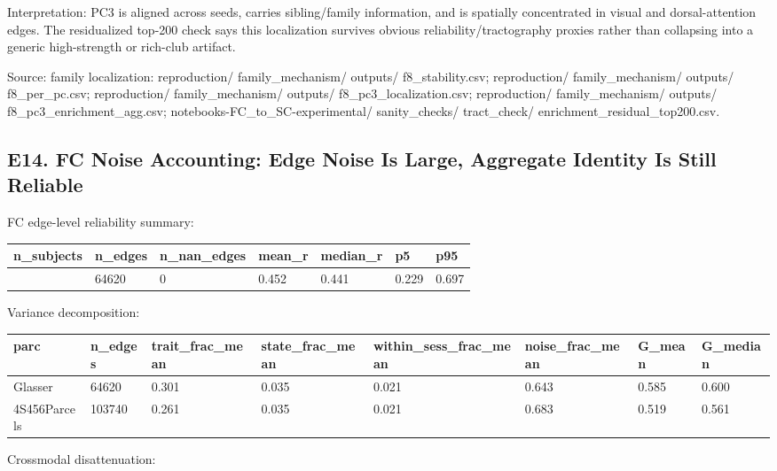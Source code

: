 Interpretation: PC3 is aligned across seeds, carries sibling/family information, and is spatially concentrated in visual and dorsal-attention edges. The residualized top-200 check says this localization survives obvious reliability/tractography proxies rather than collapsing into a generic high-strength or rich-club artifact.

Source: family localization: reproduction/ family\_mechanism/ outputs/ f8\_stability.csv; reproduction/ family\_mechanism/ outputs/ f8\_per\_pc.csv; reproduction/ family\_mechanism/ outputs/ f8\_pc3\_localization.csv; reproduction/ family\_mechanism/ outputs/ f8\_pc3\_enrichment\_agg.csv; notebooks-FC\_to\_SC-experimental/ sanity\_checks/ tract\_check/ enrichment\_residual\_top200.csv.

\subsection{E14. FC Noise Accounting: Edge Noise Is Large, Aggregate Identity Is Still Reliable}\label{e14-fc-noise-accounting-edge-noise-is-large-aggregate-identity-is-still-reliable}

FC edge-level reliability summary:

{\def\LTcaptype{none} %
\begin{longtable}[]{@{}lllllll@{}}
\toprule\noalign{}
n\_subjects & n\_edges & n\_nan\_edges & mean\_r & median\_r & p5 & p95 \\
\midrule\noalign{}
\endhead
\bottomrule\noalign{}
\endlastfoot
957 & 64620 & 0 & 0.452 & 0.441 & 0.229 & 0.697 \\
\end{longtable}
}

Variance decomposition:

{\def\LTcaptype{none} %
\begin{longtable}[]{@{}llllllll@{}}
\toprule\noalign{}
parc & n\_edges & trait\_frac\_mean & state\_frac\_mean & within\_sess\_frac\_mean & noise\_frac\_mean & G\_mean & G\_median \\
\midrule\noalign{}
\endhead
\bottomrule\noalign{}
\endlastfoot
Glasser & 64620 & 0.301 & 0.035 & 0.021 & 0.643 & 0.585 & 0.600 \\
4S456Parcels & 103740 & 0.261 & 0.035 & 0.021 & 0.683 & 0.519 & 0.561 \\
\end{longtable}
}

Crossmodal disattenuation:

